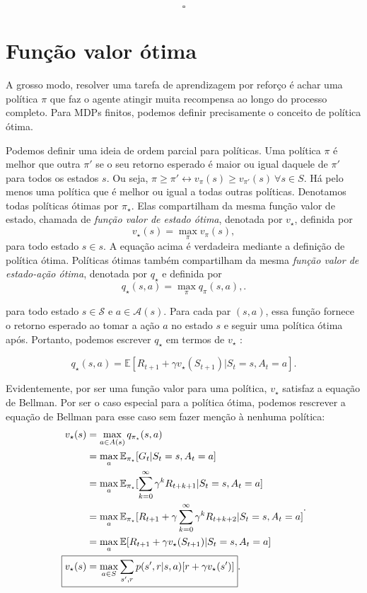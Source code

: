 \documentclass{article}
\begin{document}
\[
\square
\] 
\section{Função valor ótima}

A grosso modo, resolver uma tarefa de aprendizagem por reforço é achar uma política $\pi$ que faz o agente atingir muita recompensa ao longo do processo completo. Para MDPs finitos, podemos definir precisamente o conceito de política ótima. 

Podemos definir uma ideia de ordem parcial para políticas. Uma política $\pi$ é melhor que outra $\pi'$ se o seu retorno esperado é maior ou igual daquele de $\pi'$ para todos os estados $s$. Ou seja, $\pi \ge \pi' \leftrightarrow v_{\pi}(s) \ge v_{\pi'}(s)\ \forall s \in S$. Há pelo menos uma política que é melhor ou igual a todas outras políticas. Denotamos todas políticas ótimas por $\pi_{\star}$. Elas compartilham da mesma função valor de estado, chamada de \textit{função valor de estado ótima}, denotada por $v_{\star}$, definida por
\[
  v_{\star}(s)=\max_{\pi}v_{\pi}(s),
\] 
para todo estado $s \in s$. A equação acima é verdadeira mediante a definição de política ótima. Políticas ótimas também compartilham da mesma \textit{função valor de estado-ação ótima}, denotada por $q_{\star}$ e definida por
\[
  q_{\star}(s,a)=\max_{\pi}q_{\pi}(s,a),
.\] 

para todo estado $s \in \mathcal{S}$ e $a \in \mathcal{A}(s)$. Para cada par $(s,a)$, essa função fornece o retorno esperado ao tomar a ação $a$ no estado $s$ e seguir uma política ótima após. Portanto, podemos escrever $q_{\star}$ em termos de $v_{\star}$ :

\[
  q_{\star}(s,a)=\mathbb{E}[R_{t+1}+\gamma v_{\star}(S_{t+1})| S_t = s, A_t = a]
.\] 


Evidentemente, por ser uma função valor para uma política, $v_{\star}$ satisfaz a equação de Bellman. Por ser o caso especial para a política ótima, podemos rescrever a equação de Bellman para esse caso sem fazer menção à nenhuma política:
\[
\begin{align*}
  v_{\star}(s) &= \max_{a \in A(s)}q_{\pi_{\star}}(s,a)\\
               &= \max_{a}\mathbb{E}_{\pi_{\star}}[G_t|S_t=s, A_t=a]\\
               &= \max_{a}\mathbb{E}_{\pi_{\star}}[\sum_{k=0}^{\infty}{\gamma}^kR_{t+k+1}|S_t=s, A_t=a]\\
               &= \max_{a}\mathbb{E}_{\pi_{\star}}[R_{t+1}+\gamma\sum_{k=0}^{\infty}{\gamma}^kR_{t+k+2}|S_t=s, A_t=a]\\
               &= \max_{a}\mathbb{E}[R_{t+1}+\gamma v_{\star}(S_{t+1})|S_t=s, A_t=a]\\
  \Aboxed{v_{\star}(s) &= \max_{a \in S}\sum_{s',r} p(s',r|s,a)[r+\gamma v_{\star}(s')]}
.\end{align*}
.\] 
\end{document}
